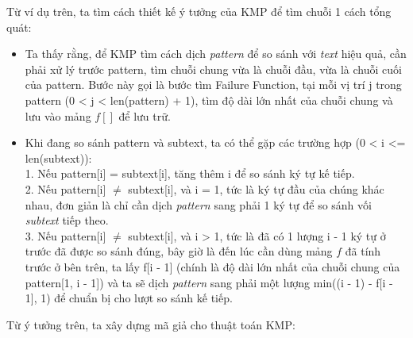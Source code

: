 \documentclass[a4paper,11pt]{article}
\begin{document}
			Từ ví dụ trên, ta tìm cách thiết kế ý tưởng của KMP để tìm chuỗi 1 cách tổng quát:
			\begin{itemize}
				\item Ta thấy rằng, để KMP tìm cách dịch \textit{pattern} để so sánh với \textit{text} hiệu quả, cần phải xử lý trước pattern, tìm chuỗi chung vừa là chuỗi đầu, vừa là chuỗi cuối của pattern.
				Bước này gọi là bước tìm Failure Function, tại mỗi vị trí j trong pattern (0 < j < len(pattern) + 1), tìm độ dài lớn nhất của chuỗi chung và lưu vào mảng $f[]$ để lưu trữ.
				\item Khi đang so sánh pattern và subtext, ta có thể gặp các trường hợp (0 < i <= len(subtext)): \\
				1. Nếu pattern[i] = subtext[i], tăng thêm i để so sánh ký tự kế tiếp. \\
				2. Nếu pattern[i] $\neq$ subtext[i], và i = 1, tức là ký tự đầu của chúng khác nhau, đơn giản là chỉ cần dịch \textit{pattern} sang phải 1 ký tự để so sánh vối \textit{subtext} tiếp theo.\\
				3. Nếu pattern[i] $\neq$ subtext[i], và i > 1, tức là đã có 1 lượng i - 1 ký tự ở trước đã được so sánh đúng, bây giờ là đến lúc cần dùng mảng $f$ đã tính trước ở bên trên, ta lấy f[i - 1] 
				(chính là độ dài lớn nhất của chuỗi chung của pattern[1, i - 1]) và ta sẽ dịch \textit{pattern} sang phải một lượng min((i - 1) - f[i - 1], 1) để chuẩn bị cho lượt so sánh kế tiếp.
			\end{itemize}
			
			Từ ý tưởng trên, ta xây dựng mã giả cho thuật toán KMP:
\end{document}
